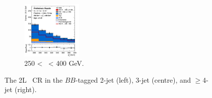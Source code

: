 \begin{figure}[h!]
\begin{subfigure}[b]{\textwidth}
        \includegraphics[width=0.32\textwidth]{Images/VH/Own_fit/postfit_VHbb/Region_distpTV_BMax400_BMin250_DCRHigh_J4_TTypebb_incJet1_T2_L2_Y6051_GlobalFit_conditionnal_mu1.png}
        \caption{250 < \ptv\ < 400 GeV.}
        \label{fig:plots_VHbb_2L_250_CRH}
    \end{subfigure}
    \caption{The 2L \highdr\ CR in the $BB$-tagged 2-jet (left), 3-jet (centre), and $\geq$4-jet (right).}
    \label{fig:plots_VHbb_2L_CRH}
\end{figure} 
\vspace*{\fill}